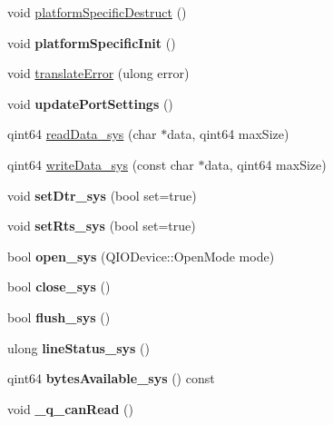 \begin{DoxyCompactItemize}
\item 
void \mbox{\hyperlink{class_qext_serial_port_private_a8ef78d13b2e0729836cd7b159bee48f2}{platform\+Specific\+Destruct}} ()
\item 
\mbox{\label{class_qext_serial_port_private_af1ab77f7e4e20e81a7fe2ea2f5c32649}} 
void {\bfseries platform\+Specific\+Init} ()
\item 
void \mbox{\hyperlink{class_qext_serial_port_private_af7dc13c59e6155d7812cd86c956cf7da}{translate\+Error}} (ulong error)
\item 
\mbox{\label{class_qext_serial_port_private_a425789fa977cd723373db4b86b2444bc}} 
void {\bfseries update\+Port\+Settings} ()
\item 
qint64 \mbox{\hyperlink{class_qext_serial_port_private_a0c76b5bb1bba7aee3a95d67c92628444}{read\+Data\+\_\+sys}} (char $\ast$data, qint64 max\+Size)
\item 
qint64 \mbox{\hyperlink{class_qext_serial_port_private_af0226826fd063ab5a87d68c4e92458bc}{write\+Data\+\_\+sys}} (const char $\ast$data, qint64 max\+Size)
\item 
\mbox{\label{class_qext_serial_port_private_a1cf571ccd3a7e228fac804fc9f62fc76}} 
void {\bfseries set\+Dtr\+\_\+sys} (bool set=true)
\item 
\mbox{\label{class_qext_serial_port_private_a02828c7f2ff1d6f780b867d3e8993d4e}} 
void {\bfseries set\+Rts\+\_\+sys} (bool set=true)
\item 
\mbox{\label{class_qext_serial_port_private_ac2c5ef6fd788dc8c2ddc0d2ec05b74a2}} 
bool {\bfseries open\+\_\+sys} (Q\+I\+O\+Device\+::\+Open\+Mode mode)
\item 
\mbox{\label{class_qext_serial_port_private_acf41cafcb46244bc8ca4cb529dcc8727}} 
bool {\bfseries close\+\_\+sys} ()
\item 
\mbox{\label{class_qext_serial_port_private_a3346f8b8fc771251a9ddcde9f69c2901}} 
bool {\bfseries flush\+\_\+sys} ()
\item 
\mbox{\label{class_qext_serial_port_private_aa72287f6e321245663aea39cdf932576}} 
ulong {\bfseries line\+Status\+\_\+sys} ()
\item 
\mbox{\label{class_qext_serial_port_private_a9678598142468ebec0f7b8b6466cd781}} 
qint64 {\bfseries bytes\+Available\+\_\+sys} () const
\item 
\mbox{\label{class_qext_serial_port_private_a67f3abc3225a4d1e54826b10b039ae40}} 
void {\bfseries \+\_\+q\+\_\+can\+Read} ()
\end{DoxyCompactItemize}
